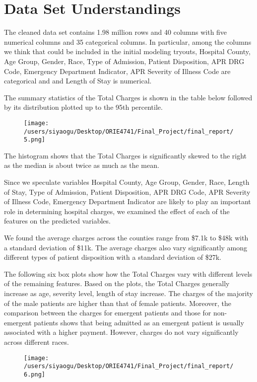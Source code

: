 \documentclass[journal, a4paper,11pt]{IEEEtran}
\begin{document}
\section{Data Set Understandings}
	The cleaned data set contains 1.98 million rows and 40 columns with five numerical columns and 35 categorical columns. In particular, among the columns we think that could be included in the initial modeling tryouts, Hospital County, Age Group, Gender, Race, Type of Admission, Patient Disposition, APR DRG Code, Emergency Department Indicator, APR Severity of Illness Code are categorical and and Length of Stay is numerical. 
    
	The summary statistics of the Total Charges is shown in the table below followed by its distribution plotted up to the 95th percentile. 

    	\begin{figure}[ht]
	\centering
	\texttt{[image: /users/siyaogu/Desktop/ORIE4741/Final\_Project/final\_report/5.png]}
	\end{figure}
	
	The histogram shows that the Total Charges is significantly skewed to the right as the median is about twice as much as the mean. 

	Since we speculate variables Hospital County, Age Group, Gender, Race, Length of Stay, Type of Admission, Patient Disposition, APR DRG Code, APR Severity of Illness Code, Emergency Department Indicator are likely to play an important role in determining hospital charges, we examined the effect of each of the features on the predicted variables. 

	We found the average charges across the counties range from \$7.1k to \$48k with a standard deviation of \$11k. The average charges also vary significantly among different types of patient disposition with a standard deviation of  \$27k. 
	
	The following six box plots show how the Total Charges vary with different levels of the remaining features. Based on the plots, the Total Charges generally increase as age, severity level, length of stay increase. The charges of the majority of the male patients are higher than that of female patients. Moreover, the comparison between the charges for emergent patients and those for non-emergent patients shows that being admitted as an emergent patient is usually associated with a higher payment. However, charges do not vary significantly across different races.

	\begin{figure}[ht]
	\centering
	\texttt{[image: /users/siyaogu/Desktop/ORIE4741/Final\_Project/final\_report/6.png]}
	\end{figure}
\end{document}
